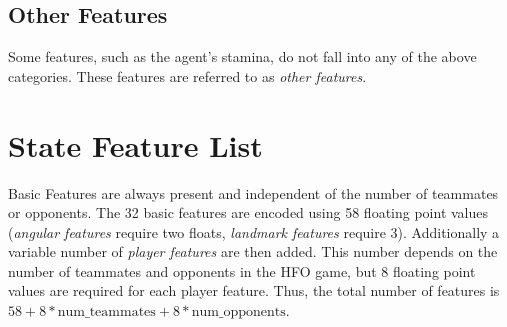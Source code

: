 \documentclass[12pt]{article}
\begin{document}
\subsection{Other Features}

Some features, such as the agent's stamina, do not fall into any of
the above categories. These features are referred to as \textit{other
  features}.

\section{State Feature List}

Basic Features are always present and independent of the number of
teammates or opponents. The 32 basic features are encoded using 58
floating point values (\textit{angular features} require two floats,
\textit{landmark features} require 3). Additionally a variable number
of \textit{player features} are then added. This number depends on the
number of teammates and opponents in the HFO game, but 8 floating
point values are required for each player feature. Thus, the total
number of features is $58 + 8*\textrm{num\_teammates} +
8*\textrm{num\_opponents}$.
\end{document}
